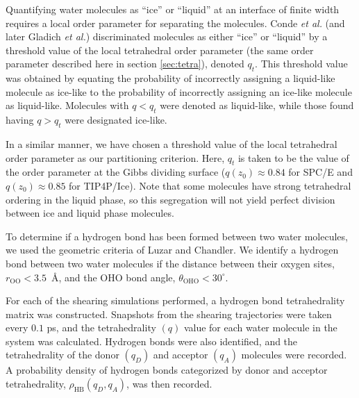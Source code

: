 Quantifying water molecules as ``ice'' or ``liquid'' at an interface
of finite width requires a local order parameter for separating the
molecules.  Conde \textit{et al.}\cite{Conde2008} (and later Gladich
\textit{et al.}\cite{Gladich2011,Gladich2015}) discriminated molecules
as either ``ice'' or ``liquid'' by a threshold value of the local
tetrahedral order parameter (the same order parameter described here
in section \ref{sec:tetra}), denoted $q_{t}$. This threshold value was
obtained by equating the probability of incorrectly assigning a
liquid-like molecule as ice-like to the probability of incorrectly
assigning an ice-like molecule as liquid-like. Molecules with
$q < q_{t}$ were denoted as liquid-like, while those found having
$q > q_{t}$ were designated ice-like.

In a similar manner, we have chosen a threshold value of the local
tetrahedral order parameter as our partitioning criterion. Here,
$q_{t}$ is taken to be the value of the order parameter at the Gibbs
dividing surface ($q(z_0) \approx 0.84$ for SPC/E and
$q(z_0) \approx 0.85$ for TIP4P/Ice).  Note that some molecules have
strong tetrahedral ordering in the liquid phase, so this segregation
will not yield perfect division between ice and liquid phase
molecules.

To determine if a hydrogen bond has been formed between two water
molecules, we used the geometric criteria of Luzar and
Chandler.\cite{Luzar1996} We identify a hydrogen bond between two
water molecules if the distance between their oxygen sites,
$r_\mathrm{OO} < 3.5$~\AA, and the OHO bond angle,
$\theta_\mathrm{OHO} < 30^\circ$.

For each of the shearing simulations performed, a hydrogen bond
tetrahedrality matrix was constructed.  Snapshots from the shearing
trajectories were taken every $0.1$ ps, and the tetrahedrality $(q)$
value for each water molecule in the system was calculated. Hydrogen
bonds were also identified, and the tetrahedrality of the donor
$(q_{D})$ and acceptor $(q_{A})$ molecules were recorded. A
probability density of hydrogen bonds categorized by donor and
acceptor tetrahedrality, $\rho_\mathrm{HB}(q_D, q_A)$, was then
recorded.

